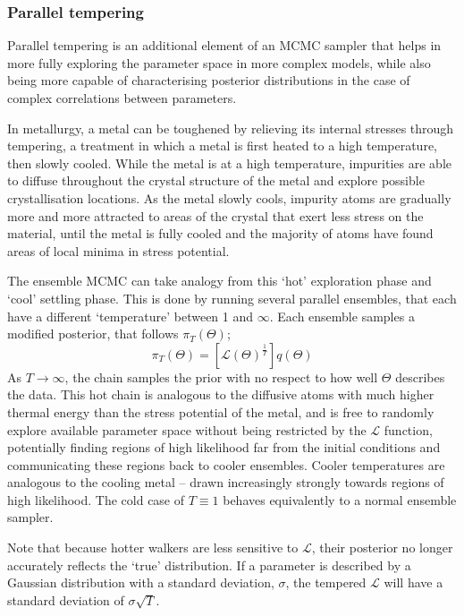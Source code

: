 \subsubsection{Parallel tempering}
\label{sect:modelling:parallel tempering}

Parallel tempering is an additional element of an MCMC sampler that helps in more fully exploring the parameter space in more complex models, while also being more capable of characterising posterior distributions in the case of complex correlations between parameters.

In metallurgy, a metal can be toughened by relieving its internal stresses through tempering, a treatment in which a metal is first heated to a high temperature, then slowly cooled.
While the metal is at a high temperature, impurities are able to diffuse throughout the crystal structure of the metal and explore possible crystallisation locations. As the metal slowly cools, impurity atoms are gradually more and more attracted to areas of the crystal that exert less stress on the material, until the metal is fully cooled and the majority of atoms have found areas of local minima in stress potential.

The ensemble MCMC can take analogy from this `hot' exploration phase and `cool' settling phase. This is done by running several parallel ensembles, that each have a different `temperature' between 1 and $\infty$. Each ensemble samples a modified posterior, that follows $\pi_T(\Theta)$;
\begin{equation}
    \pi_T(\Theta) = [\mathcal{L}(\Theta)^\frac{1}{T}] q(\Theta)
\end{equation}
As $T \rightarrow \infty$, the chain samples the prior with no respect to how well $\Theta$ describes the data. This hot chain is analogous to the diffusive atoms with much higher thermal energy than the stress potential of the metal, and is free to randomly explore available parameter space without being restricted by the $\mathcal{L}$ function, potentially finding regions of high likelihood far from the initial conditions and communicating these regions back to cooler ensembles. Cooler temperatures are analogous to the cooling metal -- drawn increasingly strongly towards regions of high likelihood.
The cold case of $T \equiv 1$ behaves equivalently to a normal ensemble sampler.

Note that because hotter walkers are less sensitive to $\mathcal{L}$, their posterior no longer accurately reflects the `true' distribution. If a parameter is described by a Gaussian distribution with a standard deviation, $\sigma$, the tempered $\mathcal{L}$ will have a standard deviation of $\sigma \sqrt{T}$.

